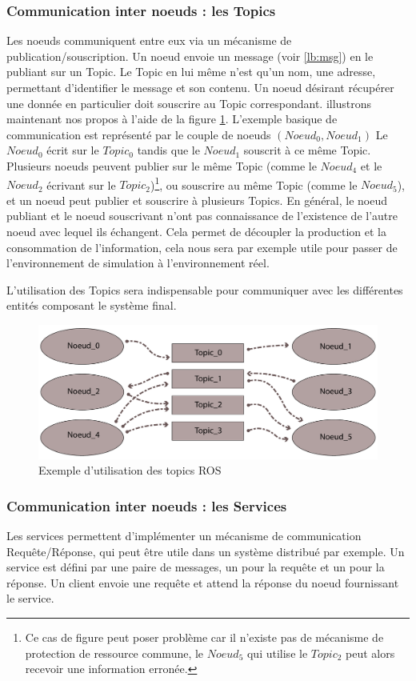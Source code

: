\documentclass{tnreport}
\begin{document}
\subsubsection{Communication inter noeuds : les Topics}
Les noeuds communiquent entre eux via un mécanisme de publication/souscription. Un noeud envoie un message (voir \ref{lb:msg}) en le publiant sur un Topic. Le Topic en lui même n'est qu'un nom, une adresse, permettant d'identifier le message et son contenu. Un noeud désirant récupérer une donnée en particulier doit souscrire au Topic correspondant. illustrons maintenant nos propos à l'aide de la figure \ref{fig:topics}. L'exemple basique de communication est représenté par le couple de noeuds $(Noeud_0,Noeud_1)$ Le $Noeud_0$ écrit sur le $Topic_0$ tandis que le $Noeud_1$ souscrit à ce même Topic. Plusieurs noeuds peuvent publier sur le même Topic (comme le $Noeud_4$ et le $Noeud_2$ écrivant sur le $Topic_2$)\footnote{Ce cas de figure peut poser problème car il n'existe pas de mécanisme de protection de ressource commune, le $Noeud_5$ qui utilise le $Topic_2$ peut alors recevoir une information erronée.}, ou souscrire au même Topic (comme le $Noeud_5$), et un noeud peut publier et souscrire à plusieurs Topics. En général, le noeud publiant et le noeud souscrivant n'ont pas connaissance de l'existence de l'autre noeud avec lequel ils échangent. Cela permet de découpler la production et la consommation de l'information, cela nous sera par exemple utile pour passer de l'environnement de simulation à l'environnement réel. 

L'utilisation des Topics sera indispensable pour communiquer avec les différentes entités composant le système final. 

\begin{figure}[h]
    \centering
    \includegraphics[width = 15cm]{figures/schema_topics_ros}
    \caption{Exemple d'utilisation des topics \gls{ROS}}
    \label{fig:topics}
\end{figure}
\subsubsection{Communication inter noeuds : les Services}
Les services permettent d'implémenter un mécanisme de communication Requête/Réponse, qui peut être utile dans un système distribué par exemple. Un service est défini par une paire de messages, un pour la requête et un pour la réponse. Un client envoie une requête et attend la réponse du noeud fournissant le service.
\end{document}
